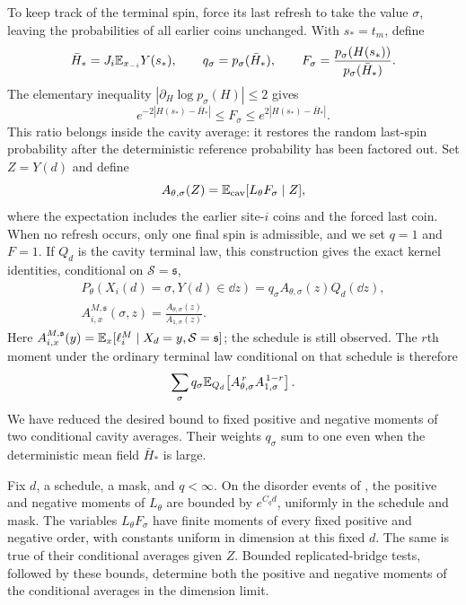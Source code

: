 To keep track of the terminal spin, force its last refresh to take the
value $\sigma$, leaving the probabilities of all earlier coins
unchanged.  With $s_*=t_m$, define
\[
 \bar H_* =J_i\mathbb E_{x_{-i}}Y(s_*),\qquad
 q_\sigma=p_\sigma(\bar H_*),\qquad
 F_\sigma=\frac{p_\sigma(H(s_*))}{p_\sigma(\bar H_*)}.
\]
The elementary inequality $|\partial_H\log p_\sigma(H)|\le2$ gives
\begin{equation}
 e^{-2|H(s_*)-\bar H_*|}\le F_\sigma
                  \le e^{2|H(s_*)-\bar H_*|}.
 \label{eq:row-forced-coin}
\end{equation}
This ratio belongs inside the cavity average: it restores the random
last-spin probability after the deterministic reference probability has
been factored out.  Set $Z=Y(d)$ and define
\[
 A_{\theta,\sigma}(Z)
   =\mathbb E_{\mathrm{cav}}[L_\theta F_\sigma\mid Z],
\]
where the expectation includes the earlier site-$i$ coins and the
forced last coin.  When no refresh occurs, only one final spin is admissible, and
we set $q=1$ and $F=1$.  If $Q_d$ is the cavity terminal law, this
construction gives the exact kernel identities, conditional on
$\mathcal S=\mathfrak s$,
\begin{equation}
 \begin{aligned}
 P_\theta(X_i(d)=\sigma,Y(d)\in\dd z)
       =q_\sigma A_{\theta,\sigma}(z)Q_d(\dd z),
 \\
 A_{i,x}^{M,\mathfrak s}(\sigma,z)
       =\frac{A_{\theta,\sigma}(z)}{A_{1,\sigma}(z)}.
 \end{aligned}
 \label{eq:row-cavity-ratio}
\end{equation}
Here $A_{i,x}^{M,\mathfrak s}(y)=
\mathbb E_x[\ell_i^M\mid X_d=y,\mathcal S=\mathfrak s]$; the schedule
is still observed. The $r$th moment under the ordinary terminal law
conditional on that schedule is therefore
\begin{equation}
 \sum_\sigma q_\sigma
  \mathbb E_{Q_d}\!\left[A_{\theta,\sigma}^{\,r}
                         A_{1,\sigma}^{\,1-r}\right].
 \label{eq:row-ratio-moment}
\end{equation}
We have reduced the desired bound to fixed positive and negative
moments of two conditional cavity averages.  Their weights $q_\sigma$
sum to one even when the deterministic mean field $\bar H_*$ is large.

\begin{lemma}
\label{lem:row-uniform-integrability}
Fix $d$, a schedule, a mask, and $q<\infty$.  On the disorder events of
, the positive and negative moments of $L_\theta$
are bounded by $e^{C_qd}$, uniformly in the schedule and mask.  The
variables $L_\theta F_\sigma$ have finite moments of every fixed positive
and negative order, with constants uniform in dimension at this fixed
$d$.  The same is true of their conditional averages given $Z$.
Bounded replicated-bridge tests, followed by these bounds, determine
both the positive and negative moments of the conditional averages in
the dimension limit.
\end{lemma}

